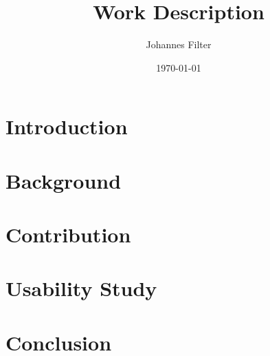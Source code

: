 \documentclass[11pt]{article}
\title{Work Description}
\date{\today}
\author{Johannes Filter}
\begin{document}
\maketitle

\tableofcontents
\newpage

\section{Introduction}
\blindtext

\section{Background}
\blindtext

\section{Contribution}
\blindtext

\section{Usability Study}
\blindtext

\section{Conclusion}
\blindtext
\end{document}
